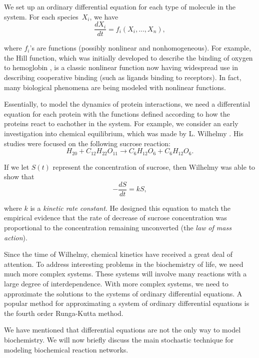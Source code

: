 \documentclass[copyright]{eptcs}
\newcommand{\noi}{\noindent}
\newcommand{\ra}{\rightarrow}
\begin{document}
We set up an ordinary differential equation for each type of molecule in the system. 
For each species~$X_i$, we have
\begin{equation}
\frac{dX_i}{dt}=f_i(X_i,...,X_n),
\label{diffeq}
\end{equation}


\noi where $f_i$'s are functions (possibly nonlinear and nonhomogeneous).  For example, the Hill function, which was initially developed to describe the binding of oxygen to hemoglobin \cite{hill10}, is a classic nonlinear function now having widespread use in describing cooperative binding (such as ligands binding to receptors).  In fact, many biological phenomena are being modeled with nonlinear functions.

Essentially, to model the dynamics of protein interactions, we need a differential equation for each protein with the functions defined according to how the proteins react to eachother in the system.  For example, we consider an early investigation into chemical equilibrium, which was made by L. Wilhelmy \cite{mcquarrie67,wilhelmy1850}.  His studies were focused on the following sucrose reaction:
\begin{equation}\label{sucrose}
H_20+C_{12}H_{22}O_{11}\ra C_6H_{12}O_6 + C_6H_{12}O_6.
\end{equation}


If we let $S(t)$ represent the concentration of sucrose, then Wilhelmy was able to show that
\begin{equation}
-\frac{dS}{dt}=kS,
\label{sucode}
\end{equation}

\noi where $k$ is a \emph{kinetic rate constant}.  He designed this equation to match the empirical evidence that the rate of decrease of sucrose concentration was proportional to the concentration remaining unconverted (the \emph{law of mass action}).




Since the time of Wilhelmy, chemical kinetics have received a great deal of attention.  To address interesting problems in the biochemistry of life, we need much more complex systems.  These systems will involve many reactions with a large degree of interdependence.  With more complex systems, we need to approximate the solutions to the systems of ordinary differential equations.  A popular method for approximating a system of ordinary differential equations is the fourth order Runga-Kutta method.  

We have mentioned that differential equations are not the only way to model biochemistry.  We will now briefly discuss the main stochastic technique for modeling biochemical reaction networks.
\end{document}
